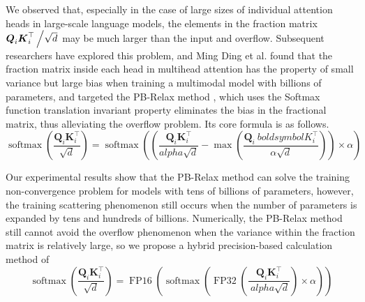 {We observed that, especially in the case of large sizes of individual attention heads in large-scale language models, the elements in the fraction matrix $\boldsymbol{Q}_i\boldsymbol{K}_i^{\top}\left/\sqrt{d}\right.$ may be much larger than the input and overflow. Subsequent researchers have explored this problem, and Ming Ding et al. found that the fraction matrix inside each head in multihead attention has the property of small variance but large bias when training a multimodal model with billions of parameters, and targeted the PB-Relax method \cite{ding2021cogview}, which uses the Softmax function translation invariant property eliminates the bias in the fractional matrix, thus alleviating the overflow problem. Its core formula is as follows.
\vspace{0.5em}
\begin{equation}
   \operatorname{softmax}\left(\frac{\boldsymbol{Q}_i\boldsymbol{K}_i^{\top}}{\sqrt{d}}\right) =
   \operatorname{softmax}\left(\left(\frac{\boldsymbol{Q}_i\boldsymbol{K}_i^{\top}}{alpha\sqrt{d}} - \max\left(\frac{\boldsymbol{Q}_i\ boldsymbol{K}_i^{\top}}{\alpha\sqrt{d}}\right)\right)\times\alpha\right) 
\end{equation}

Our experimental results show that the PB-Relax method can solve the training non-convergence problem for models with tens of billions of parameters, however, the training scattering phenomenon still occurs when the number of parameters is expanded by tens and hundreds of billions. Numerically, the PB-Relax method still cannot avoid the overflow phenomenon when the variance within the fraction matrix is relatively large, so we propose a hybrid precision-based calculation method of
\vspace{0.5em}
\begin{equation}
   \operatorname{softmax}\left(\frac{\boldsymbol{Q}_i\boldsymbol{K}_i^{\top}}{\sqrt{d}}\right) =
   \operatorname{FP16}\left(\operatorname{softmax}\left(\operatorname{FP32}\left(\frac{\boldsymbol{Q}_i\boldsymbol{K}_i^{\top}}{\ alpha\sqrt{d}}\right)\times\alpha\right)\right)
\end{equation}

}
